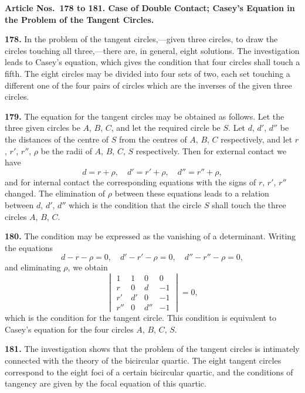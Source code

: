\documentclass[12pt,a4paper]{article}
\theoremstyle{definition}
\begin{document}
\vspace{0.5em}
\noindent\textbf{Article Nos.~178 to 181. Case of Double Contact; Casey's Equation in the Problem
of the Tangent Circles.}

\vspace{0.3em}
\noindent\textbf{178.} In the problem of the tangent circles,---given three circles, to draw the
circles touching all three,---there are, in general, eight solutions. The investigation
leads to Casey's equation, which gives the condition that four circles shall touch a fifth.
The eight circles may be divided into four sets of two, each set touching a different
one of the four pairs of circles which are the inverses of the given three circles.

\noindent\textbf{179.} The equation for the tangent circles may be obtained as follows. Let
the three given circles be $A$, $B$, $C$, and let the required circle be $S$. Let $d$, $d'$, $d''$
be the distances of the centre of $S$ from the centres of $A$, $B$, $C$ respectively, and let
$r$, $r'$, $r''$, $\rho$ be the radii of $A$, $B$, $C$, $S$ respectively. Then for external contact we have
\[
d = r + \rho, \quad d' = r' + \rho, \quad d'' = r'' + \rho,
\]
and for internal contact the corresponding equations with the signs of $r$, $r'$, $r''$
changed. The elimination of $\rho$ between these equations leads to a relation between $d$,
$d'$, $d''$ which is the condition that the circle $S$ shall touch the three circles $A$, $B$, $C$.

\newpage
\noindent\textbf{180.} The condition may be expressed as the vanishing of a determinant.
Writing the equations
\[
d - r - \rho = 0, \quad d' - r' - \rho = 0, \quad d'' - r'' - \rho = 0,
\]
and eliminating $\rho$, we obtain
\[
\begin{vmatrix}
1 & 1 & 0 & 0 \\
r & 0 & d & -1 \\
r' & d' & 0 & -1 \\
r'' & 0 & d'' & -1
\end{vmatrix}
= 0,
\]
which is the condition for the tangent circle. This condition is equivalent to Casey's
equation for the four circles $A$, $B$, $C$, $S$.

\noindent\textbf{181.} The investigation shows that the problem of the tangent circles is
intimately connected with the theory of the bicircular quartic. The eight tangent
circles correspond to the eight foci of a certain bicircular quartic, and the conditions
of tangency are given by the focal equation of this quartic.
\end{document}
